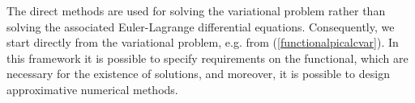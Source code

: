 % 
% 
% 


\newpage
\label{sec:dirvarmeth}

The direct methods are used for solving the variational problem rather than 
solving the associated Euler-Lagrange differential equations.
Consequently, we start directly from the variational problem, e.g. from
(\ref{functionalpicalcvar}).
In this framework it is possible to specify requirements on the functional,
which are necessary for the existence of solutions, and 
moreover, it is possible to design approximative numerical methods.


